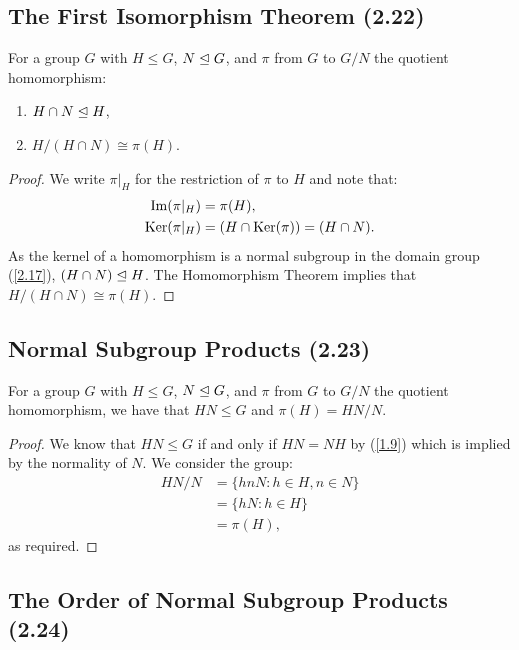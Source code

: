 \newpage

\subsection{The First Isomorphism Theorem (2.22)} \label{2.22} 

For a group $G$ with $H \leq G$, $N \trianglelefteq G$, and $\pi$ from $G$ to 
$G / N$ the quotient homomorphism: \begin{enumerate}
    \item $H \cap N \trianglelefteq H$,
    \item $H/(H \cap N) \cong \pi(H)$.
\end{enumerate}

\begin{proof}
    We write $\pi|_H$ for the restriction of $\pi$ to $H$
    and note that: \begin{align*}
        \operatorname{Im}(\pi|_H) &= \pi(H), \\
        \operatorname{Ker}(\pi|_H) &= (H \cap \operatorname{Ker}(\pi)) = (H \cap N).
    \end{align*} As the kernel of a homomorphism
    is a normal subgroup in the domain group (\ref{2.17}), \linebreak $(H \cap N) \trianglelefteq H$.
    The Homomorphism Theorem implies that $H / (H \cap N) \cong \pi(H)$.
\end{proof}

\subsection{Normal Subgroup Products (2.23)} \label{2.23}

For a group $G$ with $H \leq G$, $N \trianglelefteq G$, and $\pi$ from $G$ to 
$G / N$ the quotient homomorphism, we have that 
$HN \leq G$ and $\pi(H) = HN/N$.
\begin{proof}
    We know that $HN \leq G$ if and only if $HN = NH$ by (\ref{1.9})
    which is implied by the normality of $N$.
    We consider the group: \begin{align*}
        HN / N 
        &= \{hnN : h \in H, n \in N\} \\
        &= \{hN : h \in H\} \\
        &= \pi(H),
    \end{align*} as required.
\end{proof} 

\subsection{The Order of Normal Subgroup Products (2.24)} \label{2.24}

